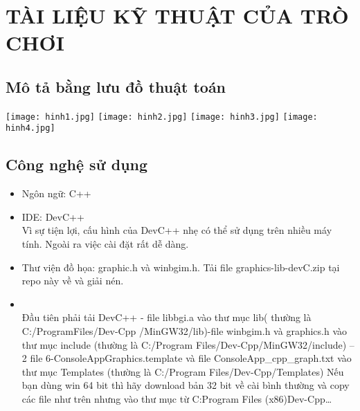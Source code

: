 \documentclass[article]{llncs}
\begin{document}
\section{TÀI LIỆU KỸ THUẬT CỦA TRÒ CHƠI}
\subsection{Mô tả bằng lưu đồ thuật toán}
\texttt{[image: hinh1.jpg]}
\texttt{[image: hinh2.jpg]}
\texttt{[image: hinh3.jpg]}
\texttt{[image: hinh4.jpg]}
\subsection{Công nghệ sử dụng}
    \begin{itemize}
        \item Ngôn ngữ: C++
    \end{itemize}
    \begin{itemize}
        \item IDE: DevC++\\
        Vì sự tiện lợi, cấu hình của DevC++ nhẹ có thể sử dụng trên nhiều máy tính. Ngoài ra việc cài đặt rất dễ dàng.
    \end{itemize}
    \begin{itemize}
        \item Thư viện đồ họa: graphic.h và winbgim.h. Tải file graphics-lib-devC.zip tại repo này về và giải nén.
    \end{itemize}
    \begin{itemize}
        \item \\
        Đầu tiên phải tải DevC++ - file libbgi.a vào thư mục lib( thường là C:/ProgramFiles/Dev-Cpp /MinGW32/lib)-file winbgim.h và graphics.h vào thư mục include (thường là C:/Program Files/Dev-Cpp/MinGW32/include) – 2 file 6-ConsoleAppGraphics.template và file ConsoleApp_cpp_graph.txt vào thư mục Templates (thường là C:/Program Files/Dev-Cpp/Templates) Nếu bạn dùng win 64 bit thì hãy download bản 32 bit về cài bình thường và copy các file như trên nhưng vào thư mục từ C:Program Files (x86)Dev-Cpp…
    \end{itemize}
\end{document}
